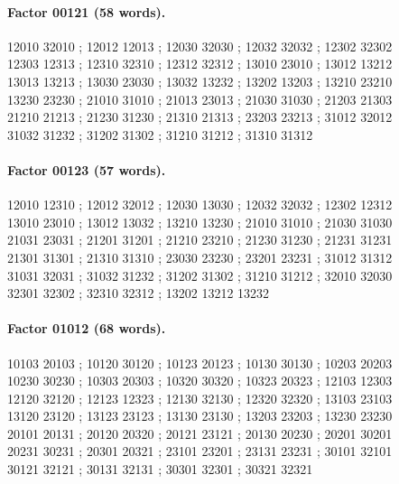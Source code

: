 \documentclass[11pt]{article}
\theoremstyle{remark}
\numberwithin{equation}{section}
\begin{document}
\paragraph{Factor 00121 (58 words).}
\begingroup\small\ttfamily\begin{flushleft}
12010 32010 ; 12012 12013 ; 12030 32030 ; 12032 32032 ; 12302 32302\\
12303 12313 ; 12310 32310 ; 12312 32312 ; 13010 23010 ; 13012 13212\\
13013 13213 ; 13030 23030 ; 13032 13232 ; 13202 13203 ; 13210 23210\\
13230 23230 ; 21010 31010 ; 21013 23013 ; 21030 31030 ; 21203 21303\\
21210 21213 ; 21230 31230 ; 21310 21313 ; 23203 23213 ; 31012 32012\\
31032 31232 ; 31202 31302 ; 31210 31212 ; 31310 31312\\
\end{flushleft}\endgroup
\paragraph{Factor 00123 (57 words).}
\begingroup\small\ttfamily\begin{flushleft}
12010 12310 ; 12012 32012 ; 12030 13030 ; 12032 32032 ; 12302 12312\\
13010 23010 ; 13012 13032 ; 13210 13230 ; 21010 31010 ; 21030 31030\\
21031 23031 ; 21201 31201 ; 21210 23210 ; 21230 31230 ; 21231 31231\\
21301 31301 ; 21310 31310 ; 23030 23230 ; 23201 23231 ; 31012 31312\\
31031 32031 ; 31032 31232 ; 31202 31302 ; 31210 31212 ; 32010 32030\\
32301 32302 ; 32310 32312 ; 13202 13212 13232\\
\end{flushleft}\endgroup
\paragraph{Factor 01012 (68 words).}
\begingroup\small\ttfamily\begin{flushleft}
10103 20103 ; 10120 30120 ; 10123 20123 ; 10130 30130 ; 10203 20203\\
10230 30230 ; 10303 20303 ; 10320 30320 ; 10323 20323 ; 12103 12303\\
12120 32120 ; 12123 12323 ; 12130 32130 ; 12320 32320 ; 13103 23103\\
13120 23120 ; 13123 23123 ; 13130 23130 ; 13203 23203 ; 13230 23230\\
20101 20131 ; 20120 20320 ; 20121 23121 ; 20130 20230 ; 20201 30201\\
20231 30231 ; 20301 20321 ; 23101 23201 ; 23131 23231 ; 30101 32101\\
30121 32121 ; 30131 32131 ; 30301 32301 ; 30321 32321\\
\end{flushleft}\endgroup
\end{document}
